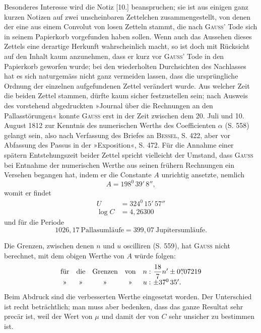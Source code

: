 \par\noindent\hspace*{\parindent}Besonderes Interesse wird die Notiz [10.] beanspruchen; sie ist aus
einigen ganz kurzen Notizen auf zwei unscheinbaren Zettelchen zusammengestellt,
von denen der eine aus einem Convolut von losen Zetteln
stammt, die nach \textsc{Gauss}' Tode sich in seinem Papierkorb vorgefunden haben sollen.
Wenn auch das Aussehen dieses Zettels eine derartige Herkunft wahrscheinlich
macht, so ist doch mit Rücksicht auf den Inhalt kaum anzunehmen, dass er kurz
vor \textsc{Gauss}' Tode in den Papierkorb geworfen wurde; bei den wiederholten
Durchsichten des Nachlasses hat es sich naturgemäss nicht ganz vermeiden lassen,
dass die ursprüngliche Ordnung der einzelnen aufgefundenen Zettel verändert wurde.
Aus welcher Zeit die beiden Zettel stammen, dürfte kaum sicher festzustellen
sein; nach Ausweis des vorstehend abgedruckten »Journal über die Rechnungen an
den Pallasstörungen« konnte \textsc{Gauss} erst in der Zeit zwischen dem 20. Juli
und 10. August 1812 zur Kenntnis des numerischen Werths des Coefficienten
\(\alpha\) (S. 558) gelangt sein, also nach Verfassung des Briefes an
\textsc{Bessel}, S. 422, aber vor Abfassung des Passus in der »Exposition«, S. 472.
Für die Annahme einer spätern Entstehungszeit beider Zettel spricht vielleicht
der Umstand, dass \textsc{Gauss} bei Entnahme der numerischen Werthe aus seinen
frühern Rechnungen ein Versehen begangen hat, indem er die Constante \(A\)
unrichtig ansetzte, nemlich
\[
A=198^0\,39'\,8'',
\]
\noindent womit er findet
\[
\begin{aligned}
U&=324^0\,15'\,57''\\
\log C&=4{,}26300
\end{aligned}
\]
\noindent und für die Periode
\[
1026{,}17\ \text{Pallasumläufe}=399{,}07\ \text{Jupitersumläufe}.
\]

\par\noindent\hspace*{\parindent}Die Grenzen, zwischen denen \(n\) und \(u\) oscilliren (S. 559), hat
\textsc{Gauss} nicht berechnet, mit dem obigen Werthe von \(A\) würde folgen:
\[
\begin{array}{ccccc@{\ }l}
\text{für}&\text{die}&\text{Grenzen}&\text{von}&n:&\dfrac{18}{7}n'\pm0\overset{\prime\prime}{,}07219\\[3pt]
\text{»}&\text{»}&\text{»}&\text{»}&u:&\pm37^0\,35'.
\end{array}
\]
\noindent Beim Abdruck sind die verbesserten Werthe eingesetzt worden. Der Unterschied
ist recht beträchtlich; man muss aber bedenken, dass das ganze Resultat sehr
precär ist, weil der Wert von \(\mu\) und damit der von \(C\) sehr unsicher zu bestimmen ist.

